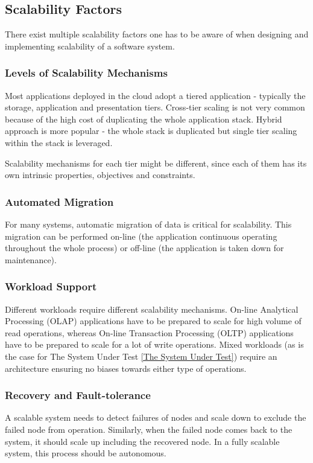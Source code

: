 \documentclass{uvamscse}
\begin{document}
\subsection{Scalability Factors}
There exist multiple scalability factors one has to be aware of when designing and implementing scalability of a software system\cite{WeiTek}.

\subsubsection{Levels of Scalability Mechanisms}
Most applications deployed in the cloud adopt a tiered application - typically the storage, application and presentation tiers. Cross-tier scaling is not very common because of the high cost of duplicating the whole application stack. Hybrid approach is more popular - the whole stack is duplicated but single tier scaling within the stack is leveraged.

Scalability mechanisms for each tier might be different, since each of them has its own intrinsic properties, objectives and constraints.

\subsubsection{Automated Migration}
For many systems, automatic migration of data is critical for scalability. This migration can be performed on-line (the application continuous operating throughout the whole process) or off-line (the application is taken down for maintenance).

\subsubsection{Workload Support}
Different workloads require different scalability mechanisms. On-line Analytical Processing (OLAP) applications have to be prepared to scale for high volume of read operations, whereas On-line Transaction Processing (OLTP) applications have to be prepared to scale for a lot of write operations. Mixed workloads (as is the case for The System Under Test \ref{The System Under Test}) require an architecture ensuring no biases towards either type of operations.

\subsubsection{Recovery and Fault-tolerance}
A scalable system needs to detect failures of nodes and scale down to exclude the failed node from operation. Similarly, when the failed node comes back to the system, it should scale up including the recovered node. In a fully scalable system, this process should be autonomous.
\end{document}
